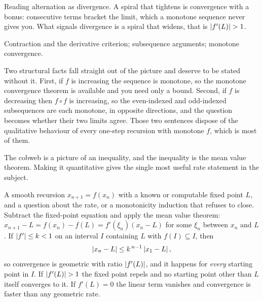 \begin{trap}
Reading alternation as divergence. A spiral that tightens is convergence with a bonus: consecutive terms bracket the limit, which a monotone sequence never gives you. What signals divergence is a spiral that widens, that is $\left\lvert f'(L)\right\rvert>1$.
\end{trap}

\begin{seealsob}Contraction and the derivative criterion; subsequence arguments; monotone convergence.\end{seealsob}

Two structural facts fall straight out of the picture and deserve to be stated without it. First, if $f$ is increasing the sequence is monotone, so the monotone convergence theorem is available and you need only a bound. Second, if $f$ is decreasing then $f\circ f$ is increasing, so the even-indexed and odd-indexed subsequences are each monotone, in opposite directions, and the question becomes whether their two limits agree. Those two sentences dispose of the qualitative behaviour of every one-step recursion with monotone $f$, which is most of them.

The cobweb is a picture of an inequality, and the inequality is the mean value theorem. Making it quantitative gives the single most useful rate statement in the subject.

\cue A smooth recursion $x_{n+1}=f(x_n)$ with a known or computable fixed point $L$, and a question about the rate, or a monotonicity induction that refuses to close.
\method Subtract the fixed-point equation and apply the mean value theorem: $x_{n+1}-L=f(x_n)-f(L)=f'(\xi_n)(x_n-L)$ for some $\xi_n$ between $x_n$ and $L$. If $\left\lvert f'\right\rvert\leq k<1$ on an interval $I$ containing $L$ with $f(I)\subseteq I$, then
\[\left\lvert x_n-L\right\rvert\leq k^{\,n-1}\left\lvert x_1-L\right\rvert,\]
so convergence is geometric with ratio $\left\lvert f'(L)\right\rvert$, and it happens for \emph{every} starting point in $I$. If $\left\lvert f'(L)\right\rvert>1$ the fixed point repels and no starting point other than $L$ itself converges to it. If $f'(L)=0$ the linear term vanishes and convergence is faster than any geometric rate.

